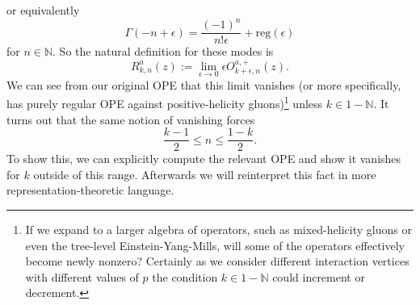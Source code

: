 \documentclass[11pt,letterpaper]{article}
\newcommand{\N}{\mathbb{N}}
\begin{document}
or equivalently \begin{equation}
\Gamma(-n + \epsilon) = \frac{(-1)^n}{n! \epsilon} + \mbox{reg}(\epsilon)
\end{equation}
for $n \in \N$. So the natural definition for these modes is \begin{equation}
R_{k,n}^a(z) := \lim_{\epsilon \to 0} \epsilon O^{a,+}_{k + \epsilon, n}(z).
\end{equation}
We can see from our original OPE that this limit vanishes (or more specifically, has purely regular OPE against positive-helicity gluons)\footnote{If we expand to a larger algebra of operators, such as mixed-helicity gluons or even the tree-level Einstein-Yang-Mills, will some of the operators effectively become newly nonzero? Certainly as we consider different interaction vertices with different values of $p$ the condition $k \in 1 - \N$ could increment or decrement.}  unless $k \in 1 - \N$. It turns out that the same notion of vanishing forces \begin{equation}
\frac{k-1}{2} \leq n \leq \frac{1-k}{2}.
\end{equation}
To show this, we can explicitly compute the relevant OPE and show it vanishes for $k$ outside of this range. Afterwards we will reinterpret this fact in more representation-theoretic language. 
\end{document}
